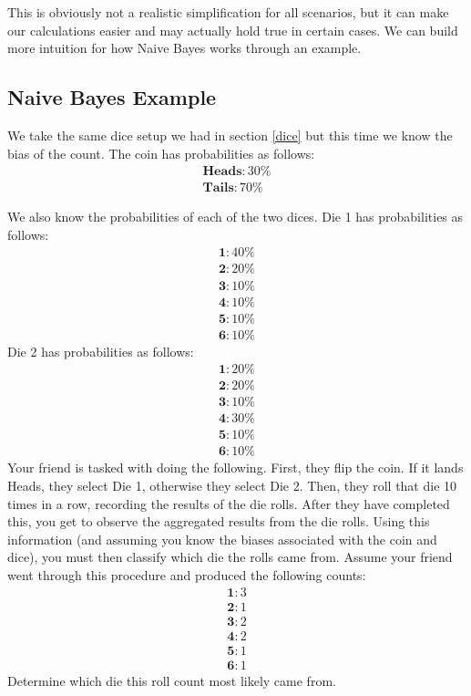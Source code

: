 \documentclass[12pt,letterpaper]{article}
\begin{document}
This is obviously not a realistic simplification for all scenarios, but it can make our calculations easier and may actually hold true in certain cases. We can build more intuition for how Naive Bayes works through an example.

\subsection{Naive Bayes Example}
	We take the same dice setup 
 we had in section \ref{dice} but this 
 time we know the bias of the count. 
 The coin has probabilities as follows:
	\begin{align*}
		\textbf{Heads}: 30\% \\
		\textbf{Tails}: 70\%
	\end{align*}

    We also know the probabilities of each of the
    two dices. Die 1 has probabilities as follows:
	\begin{align*}
		\textbf{1}: 40\% \\
		\textbf{2}: 20\% \\
		\textbf{3}: 10\% \\
		\textbf{4}: 10\% \\
		\textbf{5}: 10\% \\
		\textbf{6}: 10\%
	\end{align*}
	Die 2 has probabilities as follows:
	\begin{align*}
		\textbf{1}: 20\% \\
		\textbf{2}: 20\% \\
		\textbf{3}: 10\% \\
		\textbf{4}: 30\% \\
		\textbf{5}: 10\% \\
		\textbf{6}: 10\%
	\end{align*}
	Your friend is tasked with doing the following. First, they flip the coin. If it lands Heads, they select Die 1, otherwise they select Die 2. Then, they roll that die 10 times in a row, recording the results of the die rolls. After they have completed this, you get to observe the aggregated results from the die rolls. Using this information (and assuming you know the biases associated with the coin and dice), you must then classify which die the rolls came from. Assume your friend went through this procedure and produced the following counts:
	\begin{align*}
		\textbf{1}: 3 \\
		\textbf{2}: 1 \\
		\textbf{3}: 2 \\
		\textbf{4}: 2 \\
		\textbf{5}: 1 \\
		\textbf{6}: 1
	\end{align*}
	Determine which die this roll count most likely came from. \newline \newline
\end{document}
